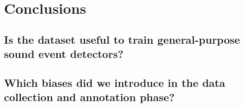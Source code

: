 
\section{Conclusions}
\label{sec:Conclusions}


\subsection{Is the dataset useful to train general-purpose sound event detectors?}
\label{sec:Conclusions:a}
\lipsum[1][1]


\subsection{Which biases did we introduce in the data collection and annotation phase?}
\label{sec:Conclusions:c}
\lipsum[1][1]

